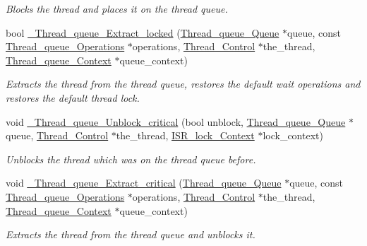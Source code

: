 \begin{DoxyCompactItemize}
\begin{DoxyCompactList}\small\item\em Blocks the thread and places it on the thread queue. \end{DoxyCompactList}\item 
bool \mbox{\hyperlink{group__RTEMSScoreThreadQueue_ga91a4a052dcfd0db5df6ff9fa16bbfb4f}{\+\_\+\+Thread\+\_\+queue\+\_\+\+Extract\+\_\+locked}} (\mbox{\hyperlink{structThread__queue__Queue}{Thread\+\_\+queue\+\_\+\+Queue}} $\ast$queue, const \mbox{\hyperlink{structThread__queue__Operations}{Thread\+\_\+queue\+\_\+\+Operations}} $\ast$operations, \mbox{\hyperlink{struct__Thread__Control}{Thread\+\_\+\+Control}} $\ast$the\+\_\+thread, \mbox{\hyperlink{structThread__queue__Context}{Thread\+\_\+queue\+\_\+\+Context}} $\ast$queue\+\_\+context)
\begin{DoxyCompactList}\small\item\em Extracts the thread from the thread queue, restores the default wait operations and restores the default thread lock. \end{DoxyCompactList}\item 
void \mbox{\hyperlink{group__RTEMSScoreThreadQueue_gae47a7180a4fc9e6e834ec4067e580296}{\+\_\+\+Thread\+\_\+queue\+\_\+\+Unblock\+\_\+critical}} (bool unblock, \mbox{\hyperlink{structThread__queue__Queue}{Thread\+\_\+queue\+\_\+\+Queue}} $\ast$queue, \mbox{\hyperlink{struct__Thread__Control}{Thread\+\_\+\+Control}} $\ast$the\+\_\+thread, \mbox{\hyperlink{structISR__lock__Context}{I\+S\+R\+\_\+lock\+\_\+\+Context}} $\ast$lock\+\_\+context)
\begin{DoxyCompactList}\small\item\em Unblocks the thread which was on the thread queue before. \end{DoxyCompactList}\item 
void \mbox{\hyperlink{group__RTEMSScoreThreadQueue_gaf6ce2524fef09fe93a24196dd392093e}{\+\_\+\+Thread\+\_\+queue\+\_\+\+Extract\+\_\+critical}} (\mbox{\hyperlink{structThread__queue__Queue}{Thread\+\_\+queue\+\_\+\+Queue}} $\ast$queue, const \mbox{\hyperlink{structThread__queue__Operations}{Thread\+\_\+queue\+\_\+\+Operations}} $\ast$operations, \mbox{\hyperlink{struct__Thread__Control}{Thread\+\_\+\+Control}} $\ast$the\+\_\+thread, \mbox{\hyperlink{structThread__queue__Context}{Thread\+\_\+queue\+\_\+\+Context}} $\ast$queue\+\_\+context)
\begin{DoxyCompactList}\small\item\em Extracts the thread from the thread queue and unblocks it. \end{DoxyCompactList}\item 

\end{DoxyCompactItemize}
